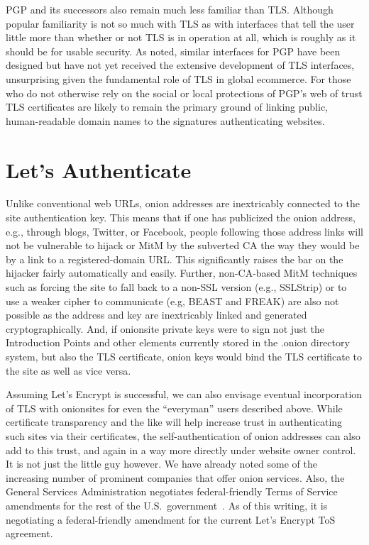 \documentclass[10pt, conference, compsocconf]{styles/IEEEtran}
\begin{document}
PGP and its successors also remain much less familiar than
TLS. Although popular familiarity is not so much with TLS as with
interfaces that tell the user little more than whether or not TLS is
in operation at all, which is roughly as it should be for usable
security. As noted, similar interfaces for PGP have been designed but
have not yet received the extensive development of TLS interfaces,
unsurprising given the fundamental role of TLS in global ecommerce.
For those who do not otherwise rely on the social or local protections
of PGP's web of trust TLS certificates are likely to remain the
primary ground of linking public, human-readable domain names to the
signatures authenticating websites.



\section{Let's Authenticate}
\label{lets-auth}

Unlike conventional web URLs, onion addresses are inextricably
connected to the site authentication key. This means that if one has
publicized the onion address, e.g., through blogs, Twitter, or
Facebook, people following those address links will not be vulnerable
to hijack or MitM by the subverted CA the way they would be by a link
to a registered-domain URL\@. 
This significantly raises the bar on the hijacker
fairly automatically and easily. Further, non-CA-based MitM techniques
such as forcing the site to fall back to a non-SSL version (e.g.,
SSLStrip) or to use a weaker cipher to communicate (e.g, BEAST and
FREAK) are also not possible as the address and key are inextricably
linked and generated cryptographically. And, if onionsite private
keys were to sign not just the Introduction Points and other elements
currently stored in the .onion directory system, but also the TLS
certificate, onion keys would bind the TLS certificate to the site as
well as vice versa. 

Assuming Let's Encrypt is successful, we can also envisage eventual
incorporation of TLS with onionsites for even the ``everyman'' users
described above.  While certificate transparency and the like will help
increase trust in authenticating such sites via their certificates,
the self-authentication of onion addresses can also add to this trust,
and again in a way more directly under website owner control.  It is
not just the little guy however. We have already noted some of the
increasing number of prominent companies that offer onion
services. Also, the General Services Administration negotiates
federal-friendly Terms of Service amendments for the rest of the U.S.\
government~\cite{gsa-tos}. As of this writing, it is negotiating a
federal-friendly amendment for the current Let's Encrypt ToS
agreement.
\end{document}
